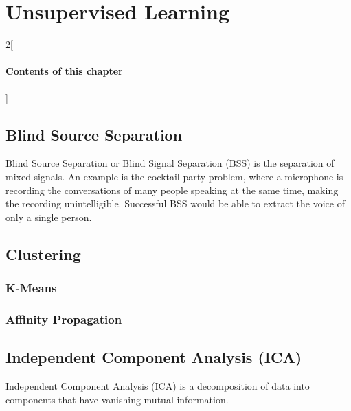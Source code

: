\chapter{Unsupervised Learning}

\begin{multicols}{2}[\subsubsection*{Contents of this chapter}]
\end{multicols}

\section{Blind Source Separation}
Blind Source Separation or Blind Signal Separation (BSS) is the separation of mixed signals. An example is the cocktail party problem, where a microphone is recording the conversations of many people speaking at the same time, making the recording unintelligible. Successful BSS would be able to extract the voice of only a single person.  

\section{Clustering}

\subsection{K-Means}
\subsection{Affinity Propagation}

\section{Independent Component Analysis (ICA)}
Independent Component Analysis (ICA) is a decomposition of data into components that have vanishing mutual information. 







\chapauthor{}	